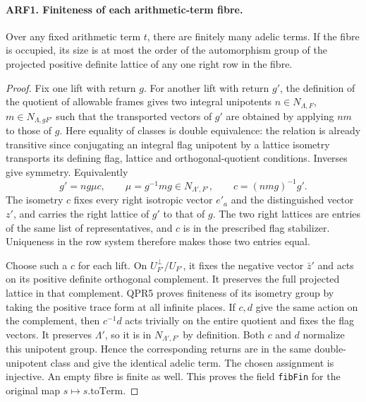 \paragraph{ARF1. Finiteness of each arithmetic-term fibre.}
Over any fixed arithmetic term $t$, there are finitely many adelic
terms. If the fibre is occupied, its size is at most the order of
the automorphism group of the projected positive definite lattice
of any one right row in the fibre.
\begin{proof}
Fix one lift with return $g$. For another lift with return $g'$,
the definition of the quotient of allowable frames gives two
integral unipotents $n\in N_{\Lambda,F}$, $m\in N_{\Lambda,gF'}$
such that the transported vectors of $g'$ are obtained by applying
$nm$ to those of $g$. Here equality of classes is double equivalence:
the relation is already transitive since conjugating an integral
flag unipotent by a lattice isometry transports its defining flag,
lattice and orthogonal-quotient conditions. Inverses give symmetry.
Equivalently
\[
       g'=n g\mu c,\qquad \mu=g^{-1}mg\in N_{\Lambda',F'},
       \qquad c=(nmg)^{-1}g'.
\]
The isometry $c$ fixes every right isotropic vector $e'_a$ and
the distinguished vector $z'$, and carries the right lattice of $g'$ to that of $g$. The two
right lattices are entries of the same list of representatives, and
$c$ is in the prescribed flag stabilizer. Uniqueness in the row
system therefore makes those two entries equal.

Choose such a $c$ for each lift. On $U_{F'}^\perp/U_{F'}$, it fixes
the negative vector $\bar z'$ and acts on its positive definite
orthogonal complement. It preserves the full projected lattice
in that complement. QPR5 proves finiteness of its isometry group
by taking the positive trace form at all infinite places.
If $c,d$ give the same action on the complement, then $c^{-1}d$
acts trivially on the entire quotient and fixes the flag vectors.
It preserves $\Lambda'$, so it is in $N_{\Lambda',F'}$ by definition.
Both $c$ and $d$ normalize this unipotent group. Hence the
corresponding returns are in the same double-unipotent class and
give the identical adelic term. The chosen assignment is injective.
An empty fibre is finite as well. This proves the field
\texttt{fibFin} for the original map $s\mapsto s.\mathrm{toTerm}$.
\end{proof}

